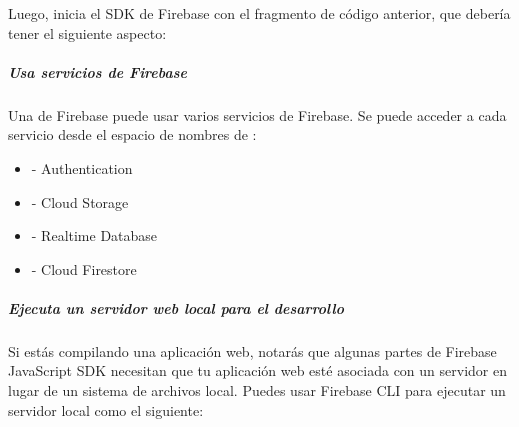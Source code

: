 Luego, inicia el SDK de Firebase con el fragmento de código anterior, que debería tener el siguiente aspecto:

%
\begin{sphinxVerbatim}[commandchars=\\\{\}]
  
           
   
   
   
   
   
\end{sphinxVerbatim}


\subparagraph{Usa servicios de Firebase}
\label{\detokenize{firebase_web:usa-servicios-de-firebase}}
Una  de Firebase puede usar varios servicios de Firebase. Se puede acceder
a cada servicio desde el espacio de nombres de :
\begin{itemize}
\item {} 
 - Authentication

\item {} 
 - Cloud Storage

\item {} 
 - Realtime Database

\item {} 
 - Cloud Firestore

\end{itemize}


\subparagraph{Ejecuta un servidor web local para el desarrollo}
\label{\detokenize{firebase_web:ejecuta-un-servidor-web-local-para-el-desarrollo}}
Si estás compilando una aplicación web, notarás que algunas partes de Firebase JavaScript SDK necesitan que tu aplicación web esté asociada con un servidor en lugar de un sistema de archivos local. Puedes usar Firebase CLI para ejecutar un servidor local como el siguiente:

